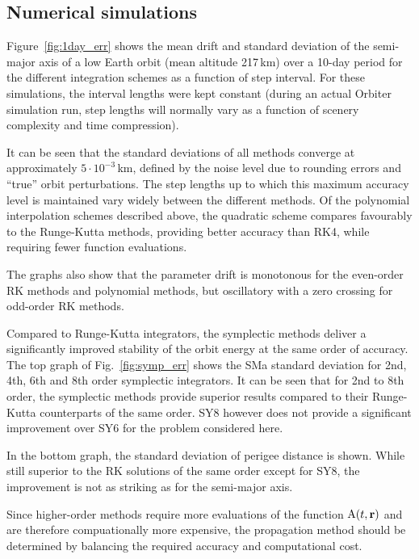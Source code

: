 \documentclass[Orbiter Technical Reference.tex]{subfiles}
\begin{document}
\subsection{Numerical simulations}\label{ssec:results}
Figure~\ref{fig:1day_err} shows the mean drift and standard deviation of the semi-major axis of a low Earth orbit (mean altitude 217\,km) over a 10-day period for the different integration schemes as a function of step interval. For these simulations, the interval lengths were kept constant (during an actual Orbiter simulation run, step lengths will normally vary as a function of scenery complexity and time compression).

It can be seen that the standard deviations of all methods converge at approximately $5\cdot 10^{-3}$\,km, defined by the noise level due to rounding errors and ``true'' orbit perturbations. The step lengths up to which this maximum accuracy level is maintained vary widely between the different methods. Of the polynomial interpolation schemes described above, the quadratic scheme compares favourably to the Runge-Kutta methods, providing better accuracy than RK4, while requiring fewer function evaluations.

The graphs also show that the parameter drift is monotonous for the even-order RK methods and polynomial methods, but oscillatory with a zero crossing for odd-order RK methods.

Compared to Runge-Kutta integrators, the symplectic methods deliver a significantly improved stability of the orbit energy at the same order of accuracy. The top graph of Fig.~\ref{fig:symp_err} shows the SMa standard deviation for 2nd, 4th, 6th and 8th order symplectic integrators. It can be seen that for 2nd to 8th order, the symplectic methods provide superior results compared to their Runge-Kutta counterparts of the same order. SY8 however does not provide a significant improvement over SY6 for the problem considered here. 

In the bottom graph, the standard deviation of perigee distance is shown. While still superior to the RK solutions of the same order except for SY8, the improvement is not as striking as for the semi-major axis.

Since higher-order methods require more evaluations of the function $\mathrm{A}(t,\mathbf{r})$ and are therefore compuationally more expensive, the propagation method should be determined by balancing the required accuracy and computational cost. 
\end{document}
